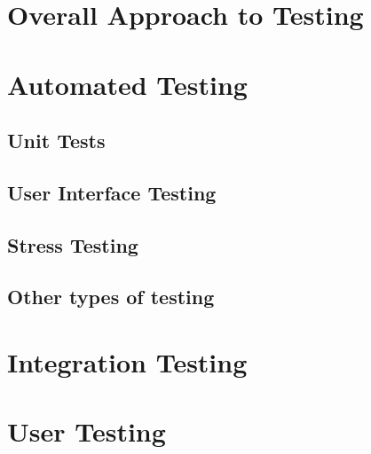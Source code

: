 \section{Overall Approach to Testing}

\section{Automated Testing}

\subsection{Unit Tests}

\subsection{User Interface Testing}

\subsection{Stress Testing}

\subsection{Other types of testing}

\section{Integration Testing}

\section{User Testing}